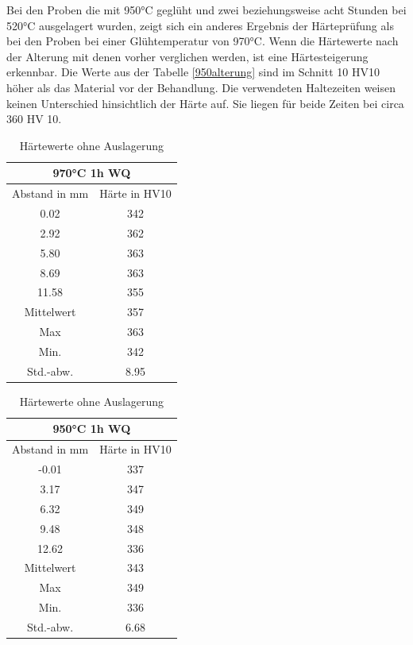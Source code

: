 \documentclass[a4paper, 11pt]{tubsreprt}
\begin{document}
Bei den Proben die mit 950°C geglüht und zwei beziehungsweise acht Stunden bei 520°C ausgelagert wurden, zeigt sich ein anderes Ergebnis der Härteprüfung als bei den Proben bei einer Glühtemperatur von 970°C. Wenn die Härtewerte nach der Alterung mit denen vorher verglichen werden, ist eine Härtesteigerung erkennbar. Die Werte aus der Tabelle \ref{950alterung} sind im Schnitt 10 HV10 höher als das Material vor der Behandlung. Die verwendeten Haltezeiten weisen keinen Unterschied hinsichtlich der Härte auf. Sie liegen für beide Zeiten bei circa 360 HV 10.
\begin{table}[t]	%
\begin{tabular}{c|c}
\multicolumn{2}{c}{970°C 1h WQ} \\
\hline 
Abstand in mm	& Härte in HV10 \\
0.02	& 342\\
2.92	& 362\\
5.80	& 363\\
8.69	& 363 \\
11.58	& 355\\
\hline
Mittelwert	& 357 \\
Max	& 363 \\
Min.	& 342 \\
Std.-abw. &	8.95 \\

\end{tabular}
\begin{tabular}{c|c}
\multicolumn{2}{c}{950°C 1h WQ} \\
\hline 	
Abstand in mm	& 	Härte in HV10 \\
-0.01	&	337 \\
3.17	&	347 \\
6.32	&	349 \\
9.48	&	348 \\ 
12.62	&	336 \\
\hline
Mittelwert &	343 \\
Max	&	349 \\
Min.	&	336 \\
Std.-abw.	&	6.68 \\

\end{tabular}
\caption{Härtewerte ohne Auslagerung}
\label{Hearte ohne Behandlung}
\end{table}
\end{document}
